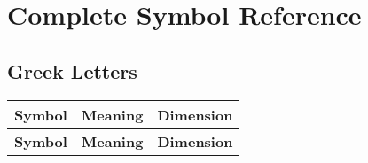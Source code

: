 \documentclass[12pt,a4paper]{report}
\begin{document}
\appendix
\chapter{Complete Symbol Reference}
\label{app:complete_symbols}

\section{Greek Letters}
\label{sec:greek_letters}

\begin{longtable}{|c|l|l|}
	\hline
	\textbf{Symbol} & \textbf{Meaning} & \textbf{Dimension} \\
	\hline
	\endfirsthead
	\hline
	\textbf{Symbol} & \textbf{Meaning} & \textbf{Dimension} \\
	\hline
	\endhead
	

\end{longtable}
\end{document}
